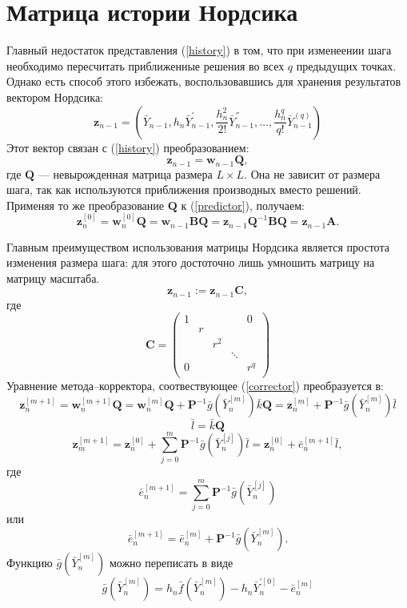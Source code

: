 \documentclass[oneside,final,14pt]{extreport}
\begin{document}
\section{Матрица истории Нордсика}
Главный недостаток представления (\ref{history}) в том, что при изменеении шага необходимо пересчитать приближенные решения во всех \(q\) предыдущих точках. Однако есть способ этого избежать, воспользовавшись для хранения результатов вектором Нордсика:
\[\mathbf z_{n-1}=\left(\bar Y_{n-1},h_n\bar Y_{n-1}^{'}, \frac{h_n^2}{2!}\bar Y_{n-1}^{''},\ldots,\frac{h_n^q}{q!}\bar Y_{n-1}^{(q)}\right)\]
Этот вектор связан с (\ref{history}) преобразованием:
\[\mathbf z_{n-1}=\mathbf w_{n-1} \mathbf Q,\]
где \(\mathbf Q\) --- невырожденная матрица размера \(L \times L\). Она не зависит от размера шага, так как используются приближения производных вместо решений. Применяя то же преобразование \(\mathbf Q\) к (\ref{predictor}), получаем:
\[
\mathbf z_n^{[0]}=\mathbf w_n^{[0]}\mathbf Q=\mathbf w_{n-1}\mathbf{B Q}=\mathbf z_{n-1}\mathbf Q^{-1}\mathbf{B Q}=\mathbf z_{n-1}\mathbf A
.\]

Главным преимуществом использования матрицы Нордсика является простота изменения размера шага: для этого достоточно лишь умношить матрицу на матрицу масштаба.
\[\mathbf z_{n-1}:=\mathbf z_{n-1} \mathbf C,\]
где
\[\mathbf C=
\begin{pmatrix}
	1 &   & & & 0\\
	  & r & & &\\
	  &   & r^2 & &\\
	  &   &  & \ddots &\\
	0 &   &  &  & r^q\\
\end{pmatrix}
\]
Уравнение метода--корректора, соотвествующее (\ref{corrector}) преобразуется в:
\[
\mathbf z_n^{[m+1]}=\mathbf w_n^{[m+1]}\mathbf Q=\mathbf w_n^{[m]}\mathbf Q+\mathbf P^{-1}\bar g(\bar Y_n^{[m]})\bar k\mathbf Q=\mathbf z_{n}^{[m]}+\mathbf P^{-1}\bar g(\bar Y_n^{[m]})\bar l
\]
\[
\bar l=\bar k\mathbf Q
\]
\begin{equation}
\label{nordseick:iteration}
\mathbf z_m^{[m+1]}=\mathbf z_n^{[0]}+\sum_{j=0}^m\mathbf P^{-1}\bar g(\bar Y_n^{[j]})\bar l=\mathbf z_n^{[0]}+\bar e_n^{[m+1]}\bar l
,\end{equation}
где
\[\bar e_n^{[m+1]}=\sum_{j=0}^m\mathbf P^{-1}\bar g(\bar Y_n^{[j]})\]
или
\[\bar e_n^{[m+1]}=\bar e_n^{[m]}+\mathbf P^{-1}\bar g(\bar Y_n^{[m]}).\]
Функцию \(\bar g(\bar Y_n^{[m]})\) можно переписать в виде
\[\bar g(\bar Y_n^{[m]})=h_n\bar f(\bar Y_n^{[m]})-h_n\bar Y_n^{'[0]}-\bar e_n^{[m]}\]
\end{document}
